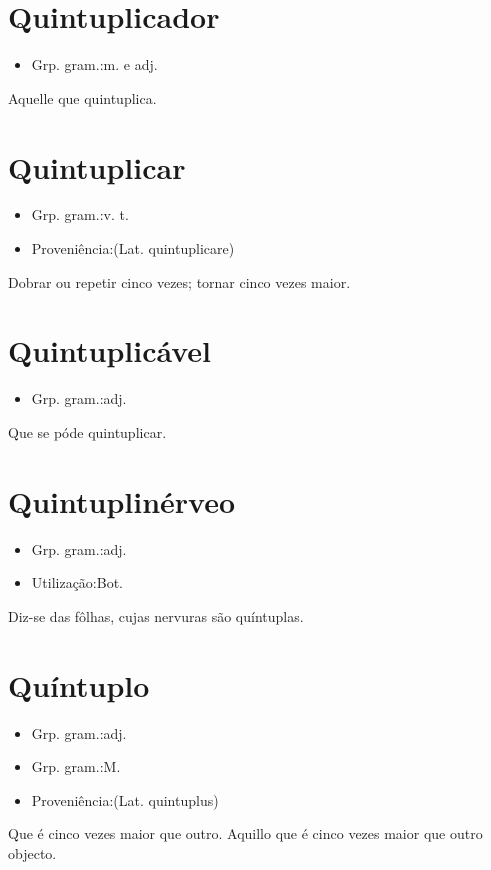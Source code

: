 \section{Quintuplicador}
\begin{itemize}
\item {Grp. gram.:m.  e  adj.}
\end{itemize}
Aquelle que quintuplica.
\section{Quintuplicar}
\begin{itemize}
\item {Grp. gram.:v. t.}
\end{itemize}
\begin{itemize}
\item {Proveniência:(Lat. \textunderscore quintuplicare\textunderscore )}
\end{itemize}
Dobrar ou repetir cinco vezes; tornar cinco vezes maior.
\section{Quintuplicável}
\begin{itemize}
\item {Grp. gram.:adj.}
\end{itemize}
Que se póde quintuplicar.
\section{Quintuplinérveo}
\begin{itemize}
\item {Grp. gram.:adj.}
\end{itemize}
\begin{itemize}
\item {Utilização:Bot.}
\end{itemize}
Diz-se das fôlhas, cujas nervuras são quíntuplas.
\section{Quíntuplo}
\begin{itemize}
\item {Grp. gram.:adj.}
\end{itemize}
\begin{itemize}
\item {Grp. gram.:M.}
\end{itemize}
\begin{itemize}
\item {Proveniência:(Lat. \textunderscore quintuplus\textunderscore )}
\end{itemize}
Que é cinco vezes maior que outro.
Aquillo que é cinco vezes maior que outro objecto.
